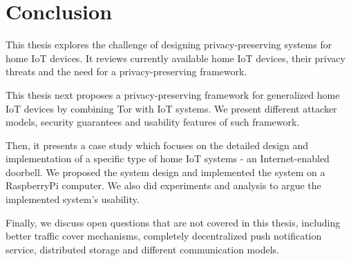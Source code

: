 \chapter{Conclusion}
This thesis explores the challenge of designing privacy-preserving systems for home IoT devices. It reviews currently available home IoT devices, their privacy threats and the need for a privacy-preserving framework.

This thesis next proposes a privacy-preserving framework for generalized home IoT devices by combining Tor with IoT systems. We present different attacker models, security guarantees and usability features of such framework.

Then, it presents a case study which focuses on the detailed design and implementation of a specific type of home IoT systems - an Internet-enabled doorbell. We proposed the system design and implemented the system on a RaspberryPi computer. We also did experiments and analysis to argue the implemented system's usability.

Finally, we discuss  open questions that are not covered in this thesis, including better traffic cover mechanisms, completely decentralized push notification service, distributed storage and different communication models.